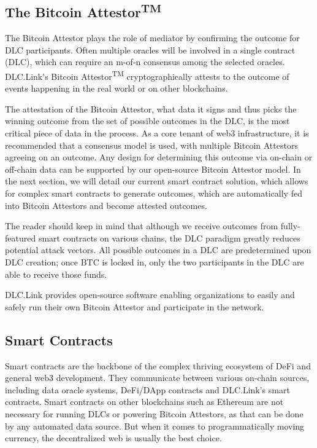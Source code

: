 \documentclass[twoside, a4paper, 11pt]{article}
\begin{document}
  \subsection{The Bitcoin Attestor\textsuperscript{TM}}

  The Bitcoin Attestor plays the role of mediator by confirming the outcome for DLC participants. Often multiple oracles will be involved in a single contract (DLC), which can require an m-of-n consensus among the selected oracles. DLC.Link’s Bitcoin Attestor\textsuperscript{TM} cryptographically attests to the outcome of events happening in the real world or on other blockchains.

  The attestation of the Bitcoin Attestor, what data it signs and thus picks the winning outcome from the set of possible outcomes in the DLC, is the most critical piece of data in the process. As a core tenant of web3 infrastructure, it is recommended that a consensus model is used, with multiple Bitcoin Attestors agreeing on an outcome. Any design for determining this outcome via on-chain or off-chain data can be supported by our open-source Bitcoin Attestor model. In the next section, we will detail our current smart contract solution, which allows for complex smart contracts to generate outcomes, which are automatically fed into Bitcoin Attestors and become attested outcomes.

  The reader should keep in mind that although we receive outcomes from fully-featured smart contracts on various chains, the DLC paradigm greatly reduces potential attack vectors. All possible outcomes in a DLC are predetermined upon DLC creation; once BTC is locked in, only the two participants in the DLC are able to receive those funds.

  DLC.Link provides open-source software enabling organizations to easily and safely run their own Bitcoin Attestor and participate in the network.

  \subsection{Smart Contracts}

  Smart contracts are the backbone of the complex thriving ecosystem of DeFi and general web3 development. They communicate between various on-chain sources, including data oracle systems, DeFi/DApp contracts and DLC.Link’s smart contracts. Smart contracts on other blockchains such as Ethereum are not necessary for running DLCs or powering Bitcoin Attestors, as that can be done by any automated data source. But when it comes to programmatically moving currency, the decentralized web is usually the best choice.
\end{document}
